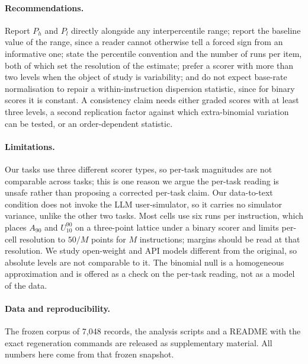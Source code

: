 \documentclass{article}
\begin{document}
\paragraph{Recommendations.} Report $P_h$ and $P_l$ directly alongside any interpercentile range;
report the baseline value of the range, since a reader cannot otherwise tell a forced sign from an
informative one; state the percentile convention and the number of runs per item, both of which set
the resolution of the estimate; prefer a scorer with more than two levels when the object of study is variability; and do not expect base-rate normalisation to repair a within-instruction dispersion statistic, since for binary scores it is constant. A consistency claim needs either graded scores with at least three levels, a second replication factor against which extra-binomial variation can be tested, or an order-dependent statistic.

\paragraph{Limitations.} Our tasks use three different scorer types, so per-task magnitudes are not
comparable across tasks; this is one reason we argue the per-task reading is unsafe rather than
proposing a corrected per-task claim. Our data-to-text condition does not invoke the LLM
user-simulator, so it carries no simulator variance, unlike the other two tasks. Most cells use six
runs per instruction, which places $A_{90}$ and $U^{90}_{10}$ on a three-point lattice under a
binary scorer and limits per-cell resolution to $50/M$ points for $M$ instructions; margins should
be read at that resolution. We study open-weight and API models different from the original, so
absolute levels are not comparable to it. The binomial null is a homogeneous approximation and is
offered as a check on the per-task reading, not as a model of the data.

\paragraph{Data and reproducibility.} The frozen corpus of 7{,}048 records, the analysis scripts and
a README with the exact regeneration commands are released as supplementary material. All numbers
here come from that frozen snapshot.
\end{document}
